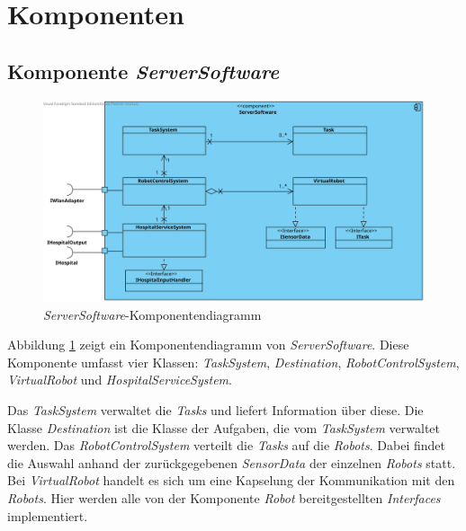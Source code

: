 \section{Komponenten}

\subsection{Komponente \textit{ServerSoftware}}
\begin{figure}[H]
\centering
\includegraphics[height=0.7\textwidth, angle=90]{img/1-Entwurf-5-ServerSoftware}
\caption{\emph{ServerSoftware}-Komponentendiagramm}
\label{KomponentenStruktur1}
\end{figure}
Abbildung \ref{KomponentenStruktur1} zeigt ein Komponentendiagramm von \emph{ServerSoftware}. Diese Komponente umfasst vier Klassen: \textit{TaskSystem}, \textit{Destination}, \textit{RobotControlSystem}, \textit{VirtualRobot} und \textit{HospitalServiceSystem}.


Das \textit{TaskSystem} verwaltet die \textit{Tasks} und liefert Information über diese. Die Klasse \textit{Destination} ist die Klasse
der Aufgaben, die vom \textit{TaskSystem} verwaltet werden. Das \textit{RobotControlSystem} verteilt die \textit{Tasks} auf die \textit{Robots}.
Dabei findet die Auswahl anhand der zurückgegebenen \textit{SensorData} der einzelnen \textit{Robots} statt. Bei \textit{VirtualRobot} handelt
es sich um eine Kapselung der Kommunikation mit den \textit{Robots}. Hier werden alle von der Komponente \textit{Robot} bereitgestellten
\textit{Interfaces} implementiert.
